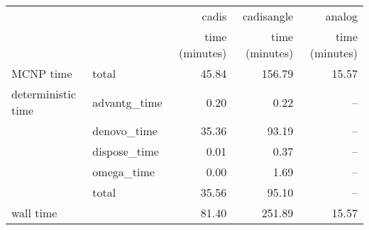 \begin{tabular}{llrrr}
\toprule
          &              &          cadis &     cadisangle &         analog \\
          &              & time (minutes) & time (minutes) & time (minutes) \\
\midrule
MCNP time & total &          45.84 &         156.79 &          15.57 \\
deterministic time & advantg\_time &           0.20 &           0.22 &            -- \\
          & denovo\_time &          35.36 &          93.19 &            -- \\
          & dispose\_time &           0.01 &           0.37 &            -- \\
          & omega\_time &           0.00 &           1.69 &            -- \\
          & total &          35.56 &          95.10 &            -- \\
wall time &              &          81.40 &         251.89 &          15.57 \\
\bottomrule
\end{tabular}
